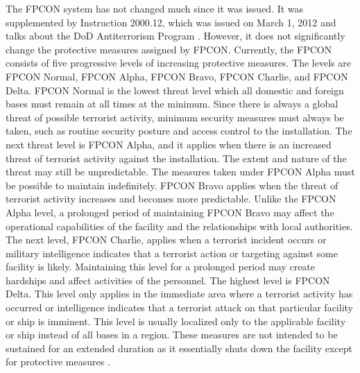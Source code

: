 \documentclass{report}
\begin{document}
The FPCON system has not changed much since it was issued.  It was supplemented by Instruction 2000.12, which was issued on March 1, 2012 and talks about the DoD Antiterrorism Program \cite{U.S.DepartmentofDefense2013}.  However, it does not significantly change the protective measures assigned by FPCON.  Currently, the FPCON consists of five progressive levels of increasing protective measures.  The levels are FPCON Normal, FPCON Alpha, FPCON Bravo, FPCON Charlie, and FPCON Delta.  FPCON Normal is the lowest threat level which all domestic and foreign bases must remain at all times at the minimum.  Since there is always a global threat of possible terrorist activity, minimum security measures must always be taken, such as routine security posture and access control to the installation.  The next threat level is FPCON Alpha, and it applies when there is an increased threat of terrorist activity against the installation.  The extent and nature of the threat may still be unpredictable.  The measures taken under FPCON Alpha must be possible to maintain indefinitely.  FPCON Bravo applies when the threat of terrorist activity increases and becomes more predictable.  Unlike the FPCON Alpha level, a prolonged period of maintaining FPCON Bravo may affect the operational capabilities of the facility and the relationships with local authorities.  The next level, FPCON Charlie, applies when a terrorist incident occurs or military intelligence indicates that a terrorist action or targeting against some facility is likely.  Maintaining this level for a prolonged period may create hardships and affect activities of the personnel.  The highest level is FPCON Delta.  This level only applies in the immediate area where a terrorist activity has occurred or intelligence indicates that a terrorist attack on that particular facility or ship is imminent.  This level is usually localized only to the applicable facility or ship instead of all bases in a region.  These measures are not intended to be sustained for an extended duration as it essentially shuts down the facility except for protective measures \cite{Usd2006}.
\end{document}
